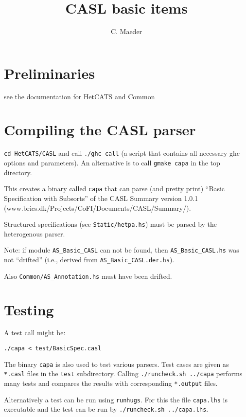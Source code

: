 \documentclass{article}
\begin{document}
\title{CASL basic items}

\author{C. Maeder}

\maketitle

\section{Preliminaries}

see the documentation for HetCATS and Common

\section{Compiling the CASL parser}

\texttt{cd HetCATS/CASL} and call \texttt{./ghc-call} (a script that contains
all necessary ghc options and parameters). An alternative is to call
\texttt{gmake capa} in the top directory.

This creates a binary called \texttt{capa} that can parse (and pretty
print) ``Basic Specification with Subsorts'' of the CASL Summary
version 1.0.1 \\ (www.brics.dk/Projects/CoFI/Documents/CASL/Summary/).

Structured specifications (see \texttt{Static/hetpa.hs}) must be parsed by the
heterogenous parser.

Note: if module \texttt{AS\_Basic\_CASL} can not be found, then
\texttt{AS\_Basic\_CASL.hs} was not ``drifted'' (i.e., derived from
\texttt{AS\_Basic\_CASL.der.hs}). 

Also \texttt{Common/AS\_Annotation.hs} must have been drifted.

\section{Testing}

A test call might be: 

\texttt{./capa < test/BasicSpec.casl}

The binary \texttt{capa} is also used to test various parsers. Test cases are
given as \texttt{*.casl} files in the \texttt{test} subdirectory. Calling
\texttt{./runcheck.sh ../capa} performs many tests and compares the results
with corresponding \texttt{*.output} files.

Alternatively a test can be run using \texttt{runhugs}. For this the
file \texttt{capa.lhs} is executable and the test can be run
by \texttt{./runcheck.sh ../capa.lhs}.
\end{document}

